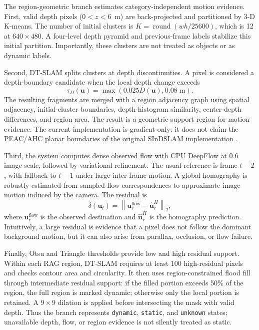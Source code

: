 \documentclass[10pt]{article}
\begin{document}
The region-geometric branch estimates category-independent motion evidence. First, valid depth pixels ($0<z<6$~m) are back-projected and partitioned by 3-D K-means. The number of initial clusters is $K=\operatorname{round}(wh/25600)$, which is 12 at $640\times480$. A four-level depth pyramid and previous-frame labels stabilize this initial partition. Importantly, these clusters are not treated as objects or as dynamic labels.

Second, DT-SLAM splits clusters at depth discontinuities. A pixel is considered a depth-boundary candidate when the local depth change exceeds
\begin{equation}
\tau_D(\mathbf{u})=\max(0.025D(\mathbf{u}),0.08\;\mathrm{m}).
\end{equation}
The resulting fragments are merged with a region adjacency graph using spatial adjacency, initial-cluster boundaries, depth-histogram similarity, center-depth differences, and region area. The result is a geometric support region for motion evidence. The current implementation is gradient-only: it does not claim the PEAC/AHC planar boundaries of the original SInDSLAM implementation \citep{sindslam}.

Third, the system computes dense observed flow with CPU DeepFlow \citep{deepflow} at 0.6 image scale, followed by variational refinement. The usual reference is frame $t-2$, with fallback to $t-1$ under large inter-frame motion. A global homography is robustly estimated from sampled flow correspondences to approximate image motion induced by the camera. The residual is
\begin{equation}
\delta(\mathbf{u}_t)=\left\|\mathbf{u}^{\mathrm{flow}}_r-\widehat{\mathbf{u}}^H_r\right\|_2,
\end{equation}
where $\mathbf{u}^{\mathrm{flow}}_r$ is the observed destination and $\widehat{\mathbf{u}}^H_r$ is the homography prediction. Intuitively, a large residual is evidence that a pixel does not follow the dominant background motion, but it can also arise from parallax, occlusion, or flow failure.

Finally, Otsu and Triangle thresholds provide low and high residual support. Within each RAG region, DT-SLAM requires at least 100 high-residual pixels and checks contour area and circularity. It then uses region-constrained flood fill through intermediate residual support: if the filled portion exceeds 50\% of the region, the full region is marked dynamic; otherwise only the local portion is retained. A $9\times9$ dilation is applied before intersecting the mask with valid depth. Thus the branch represents \texttt{dynamic}, \texttt{static}, and \texttt{unknown} states; unavailable depth, flow, or region evidence is not silently treated as static.
\end{document}
